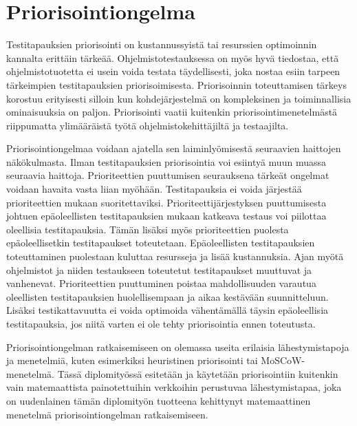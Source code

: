 \section{Priorisointiongelma} \label{ch:08_priorisointiongelma}

  Testitapauksien priorisointi on kustannussyistä tai resurssien optimoinnin kannalta erittäin tärkeää.
  Ohjelmistotestauksessa on myös hyvä tiedostaa, että ohjelmistotuotetta ei usein voida testata täydellisesti, joka nostaa esiin tarpeen tärkeimpien testitapauksien priorisoimisesta.
  Priorisoinnin toteuttamisen tärkeys korostuu erityisesti silloin kun kohdejärjestelmä on kompleksinen ja toiminnallisia ominaisuuksia on paljon.
  Priorisointi vaatii kuitenkin priorisointimenetelmästä riippumatta ylimääräistä työtä ohjelmistokehittäjiltä ja testaajilta.

  Priorisointiongelmaa voidaan ajatella sen laiminlyömisestä seuraavien haittojen näkökulmasta.
  Ilman testitapauksien priorisointia voi esiintyä muun muassa seuraavia haittoja.
  Prioriteettien puuttumisen seurauksena tärkeät ongelmat voidaan havaita vasta liian myöhään.
  Testitapauksia ei voida järjestää prioriteettien mukaan suoritettaviksi.
  Prioriteettijärjestyksen puuttumisesta johtuen epäoleellisten testitapauksien mukaan katkeava testaus voi piilottaa oleellisia testitapauksia.
  Tämän lisäksi myös prioriteettien puolesta epäoleellisetkin testitapaukset toteutetaan.
  Epäoleellisten testitapauksien toteuttaminen puolestaan kuluttaa resursseja ja lisää kustannuksia.
  Ajan myötä ohjelmistot ja niiden testaukseen toteutetut testitapaukset muuttuvat ja vanhenevat.
  Prioriteettien puuttuminen poistaa mahdollisuuden varautua oleellisten testitapauksien huolellisempaan ja aikaa kestävään suunnitteluun.
  Lisäksi testikattavuutta ei voida optimoida vähentämällä täysin epäoleellisia testitapauksia, jos niitä varten ei ole tehty priorisointia ennen toteutusta.

  Priorisointiongelman ratkaisemiseen on olemassa useita erilaisia lähestymistapoja ja menetelmiä, kuten esimerkiksi heuristinen priorisointi tai MoSCoW-menetelmä.
  Tässä diplomityössä esitetään ja käytetään priorisointiin kuitenkin vain matemaattista painotettuihin verkkoihin perustuvaa lähestymistapaa, joka on uudenlainen tämän diplomityön tuotteena kehittynyt matemaattinen menetelmä priorisointiongelman ratkaisemiseen.

